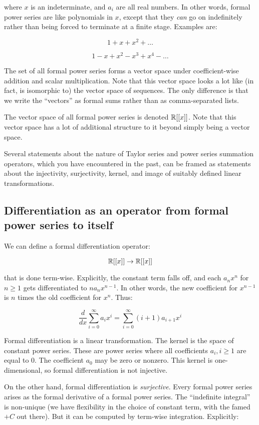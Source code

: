 \documentclass[10pt]{amsart}
\begin{document}
where $x$ is an indeterminate, and $a_i$ are all real numbers. In
other words, formal power series are like polynomials in $x$, except
that they {\em can} go on indefinitely rather than being forced to
terminate at a finite stage. Examples are:

$$1 + x + x^2 + \dots $$

$$1 - x + x^2 - x^3 + x^4 - \dots$$

The set of all formal power series forms a vector space under
coefficient-wise addition and scalar multiplication. Note that this
vector space looks a lot like (in fact, is isomorphic to) the vector
space of sequences. The only difference is that we write the
``vectors'' as formal sums rather than as comma-separated lists.

The vector space of all formal power series is denoted $\mathbb{R}[[x]]$. Note
that this vector space has a lot of additional structure to it beyond
simply being a vector space.

Several statements about the nature of Taylor series and power series
summation operators, which you have encountered in the past, can be
framed as statements about the injectivity, surjectivity, kernel, and
image of suitably defined linear transformations.

\subsection{Differentiation as an operator from formal power series to itself}

We can define a formal differentiation operator:

$$\mathbb{R}[[x]] \to \mathbb{R}[[x]]$$

that is done term-wise. Explicitly, the constant term falls off, and
each $a_nx^n$ for $n \ge 1$ gets differentiated to $na_nx^{n-1}$. In
other words, the new coefficient for $x^{n-1}$ is $n$ times the old
coefficient for $x^n$. Thus:

$$\frac{d}{dx} \sum_{i=0}^\infty a_ix^i = \sum_{i=0}^\infty (i+1)a_{i+1}x^i$$

Formal differentiation is a linear transformation. The kernel is the
space of constant power series. These are power series where all
coefficients $a_i, i \ge 1$ are equal to $0$. The coefficient $a_0$
may be zero or nonzero. This kernel is one-dimensional, so formal
differentiation is not injective.

On the other hand, formal differentiation is {\em surjective}. Every
formal power series arises as the formal derivative of a formal power
series. The ``indefinite integral'' is non-unique (we have flexibility
in the choice of constant term, with the famed $+C$ out there). But it
can be computed by term-wise integration. Explicitly:
\end{document}
